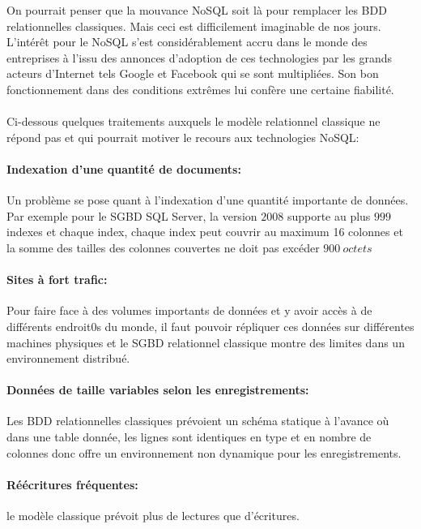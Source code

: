 On pourrait penser que la mouvance
\textsf{NoSQL} soit là pour remplacer les \textsf{BDD}
relationnelles classiques. Mais ceci est difficilement imaginable de
nos jours. L’intérêt pour le \textsf{NoSQL} s'est considérablement
accru dans le monde des entreprises à l'issu des annonces d’adoption 
de ces technologies par les grands acteurs d'\textsf{Internet} tels 
\textsf{Google} et \textsf{Facebook} qui se sont multipliées. Son bon 
fonctionnement dans des conditions extrêmes lui confère une certaine fiabilité.
\\
\\
Ci-dessous quelques traitements auxquels le modèle relationnel
classique ne répond pas et qui pourrait motiver le recours aux
technologies \textsf{NoSQL}:

\paragraph{Indexation d'une quantité de documents:}
Un problème se pose quant à l'indexation d'une quantité importante de
données. Par exemple pour le \textsf{SGBD} \textsf{SQL Server}, la
version $2008$ supporte au plus $999$ indexes et chaque index, chaque
index peut couvrir au maximum 16 colonnes et la somme des tailles des
colonnes couvertes ne doit pas excéder $900\ octets$\cite{SQLserver}

\paragraph{Sites à fort trafic:} Pour faire face à des volumes importants 
de données et y avoir accès à de différents endroit0s du monde, il faut 
pouvoir répliquer ces données sur différentes machines physiques et le 
\textsf{SGBD} relationnel classique montre des limites dans un 
environnement distribué. 

\paragraph{Données de taille variables selon les enregistrements:} Les 
\textsf{BDD} relationnelles classiques prévoient un schéma statique à 
l'avance où dans une table donnée, les lignes sont identiques en type et 
en nombre de colonnes donc offre un environnement non dynamique pour les 
enregistrements.

\paragraph{Réécritures fréquentes:} le modèle classique prévoit plus 
de lectures que d'écritures.

